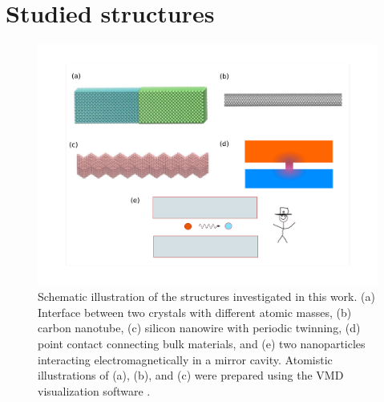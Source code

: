  \cite{dhar03,roy07,jacquet09}  %



\section{Studied structures}

\begin{figure}
\begin{center}
 \includegraphics[width=1\columnwidth]{inkscape/systems.pdf} 
 \caption{Schematic illustration of the structures investigated in this work. (a) Interface between two crystals with different atomic masses, (b) carbon nanotube, (c) silicon nanowire with periodic twinning, (d) point contact connecting bulk materials, and (e) two nanoparticles interacting electromagnetically in a mirror cavity. Atomistic illustrations of (a), (b), and (c) were prepared using the VMD visualization software \cite{humphrey96}.}
\label{fig:intro_structures}
\end{center}
\end{figure}

